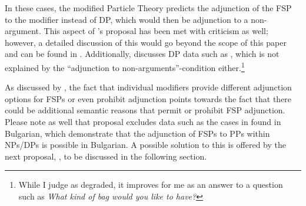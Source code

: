 \documentclass[output=paper,colorlinks,citecolor=brown]{langscibook}
\begin{document}
\noindent In these cases, the modified Particle Theory predicts the adjunction of the FSP to the modifier instead of DP, which would then be adjunction to a non-argument. This aspect of \citeauthor{BuringHartmann2001}'s proposal has been met with criticism as well; however, a detailed discussion of this would go beyond the scope of this paper and can be found in \citet{Mursell2021}. Additionally, \citet[247-248]{Mursell2021} discusses DP data such as , which is not explained by the ``adjunction to non-arguments''-condition either.\footnote{While I judge  as degraded, it improves for me as an answer to a question such as \textit{What kind of bag would you like to have?}} 

\ea\label{Mursell:basic1}  
\label{Mursell:basic1a}
\label{Mursell:basic1b}
\z
\z 

\noindent As discussed by \citet{Mursell2021}, the fact that individual modifiers provide different adjunction options for FSPs or even prohibit adjunction points towards the fact that there could be additional semantic reasons that permit or prohibit FSP adjunction. Please note as well that  proposal excludes data such as the cases in  found in Bulgarian, which demonstrate that the adjunction of FSPs to PPs within NPs/DPs is possible in Bulgarian. A possible solution to this is offered by the next proposal, \citet{Zanon2018}, to be discussed in the following section.  
\end{document}
